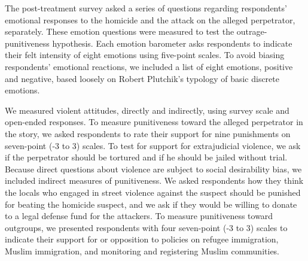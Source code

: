 The post-treatment survey asked a series of questions regarding respondents' emotional responses to the homicide and the attack on the alleged perpetrator, separately. These emotion questions were measured to test the outrage-punitiveness hypothesis. Each emotion barometer asks respondents to indicate their felt intensity of eight emotions using five-point scales. To avoid biasing respondents' emotional reactions, we included a list of eight emotions, positive and negative, based loosely on Robert Plutchik's typology of basic discrete emotions.

We measured violent attitudes, directly and indirectly, using survey scale and open-ended responses. To measure punitiveness toward the alleged perpetrator in the story, we asked respondents to rate their support for nine punishments on seven-point (-3 to 3) scales. To test for support for extrajudicial violence, we ask if the perpetrator should be tortured and if he should be jailed without trial. Because direct questions about violence are subject to social desirability bias, we included indirect measures of punitiveness. We asked respondents how they think the locals who engaged in street violence against the suspect should be punished for beating the homicide suspect, and we ask if they would be willing to donate to a legal defense fund for the attackers. To measure punitiveness toward outgroups, we presented respondents with four seven-point (-3 to 3) scales to indicate their support for or opposition to policies on refugee immigration, Muslim immigration, and monitoring and registering Muslim communities.

